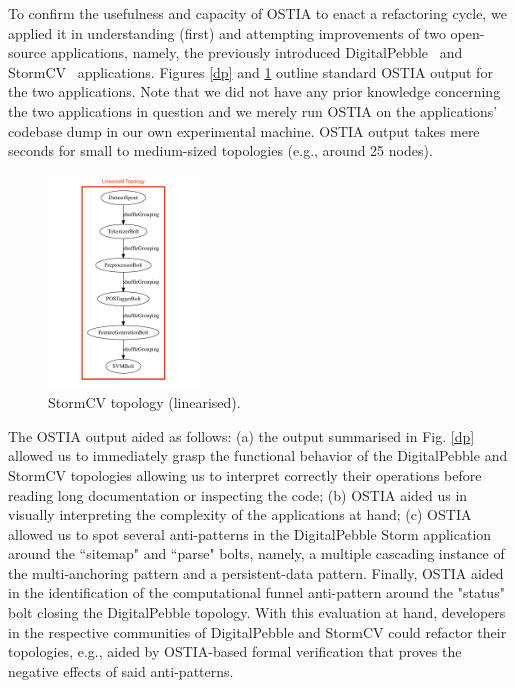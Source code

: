 \documentclass[smallextended]{svjour3}       %
\begin{document}
To confirm the usefulness and capacity of OSTIA to enact a refactoring cycle, we applied it in understanding (first) and attempting
improvements of two open-source applications, namely, the previously introduced
DigitalPebble~\cite{digitalpebble} and 
StormCV~\cite{stormCV}
applications. Figures \ref{dp} and \ref{scv} outline standard OSTIA output for the two applications. Note that we did not have any prior knowledge concerning the two applications in question and we merely run OSTIA on the applications' codebase dump in our own experimental machine. OSTIA output takes mere seconds for small to medium-sized topologies (e.g., around 25 nodes). 
%
\begin{figure}
\begin{center}
\includegraphics[width=4cm,draft]{fig9}
		\caption{StormCV topology (linearised).}
		\label{scv}
		\end{center}
\end{figure}

The OSTIA output aided as follows: (a) the output summarised in Fig. \ref{dp}
allowed us to immediately grasp the functional behavior of the DigitalPebble and
StormCV topologies allowing us to interpret correctly their operations before
reading long documentation or inspecting the code; (b) OSTIA aided us in visually interpreting the complexity of the applications at hand; (c) OSTIA allowed us to spot several anti-patterns in the DigitalPebble Storm application around the ``sitemap" and ``parse" bolts, namely, a multiple cascading instance of the multi-anchoring pattern and a persistent-data pattern. Finally, OSTIA aided in the identification of the computational funnel anti-pattern around the "status" bolt closing the DigitalPebble topology. With this evaluation at hand, developers in the respective communities of DigitalPebble and StormCV could refactor their topologies, e.g., aided by OSTIA-based formal verification that proves the negative effects of said anti-patterns.
\end{document}
